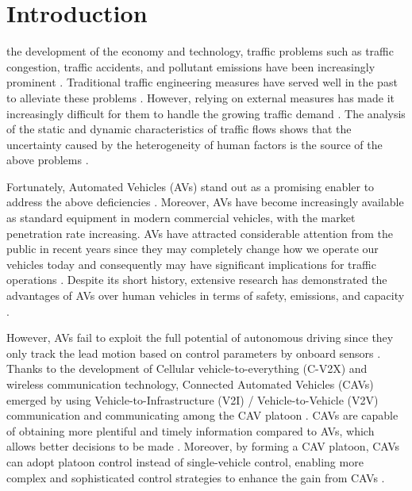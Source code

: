 \documentclass[journal]{IEEEtran}
\begin{document}
\IEEEpeerreviewmaketitle


\section{Introduction}
\label{Section 1}
% 
% 
% 
% 
 the development of the economy and technology, traffic problems such as traffic congestion, traffic accidents, and pollutant emissions have been increasingly prominent \citep{Wu2022,Malik2022,Behrendt2022}. Traditional traffic engineering measures have served well in the past to alleviate these problems \citep{Fricker2004,Hay1977}. However, relying on external measures has made it increasingly difficult for them to handle the growing traffic demand \citep{Zhong2020a,Ye2018a}. The analysis of the static and dynamic characteristics of traffic flows shows that the uncertainty caused by the heterogeneity of human factors is the source of the above problems \citep{Arem2016a,Yu2021a,vanLint2016}.

Fortunately, Automated Vehicles (AVs) stand out as a promising enabler to address the above deficiencies \citep{Rudin-Brown2004,Nikolos2015a}. Moreover, AVs have become increasingly available as standard equipment in modern commercial vehicles, with the market penetration rate increasing. AVs have attracted considerable attention from the public in recent years since they may completely change how we operate our vehicles today and consequently may have significant implications for traffic operations \citep{Kesting2007,Delis2016}. Despite its short history, extensive research has demonstrated the advantages of AVs over human vehicles in terms of safety, emissions, and capacity \citep{Ngoduy2012,Ioannou2005,Kerner2021}.

However, AVs fail to exploit the full potential of autonomous driving since they only track the lead motion based on control parameters by onboard sensors \citep{Ruan2022,Brunner2022}. Thanks to the development of Cellular vehicle-to-everything (C-V2X) and wireless communication technology, Connected Automated Vehicles (CAVs) emerged by using Vehicle-to-Infrastructure (V2I) / Vehicle-to-Vehicle (V2V) communication and communicating among the CAV platoon \citep{Wang2022,Qin2021a}. CAVs are capable of obtaining more plentiful and timely information compared to AVs, which allows better decisions to be made \citep{Mu2021,Liu2021b}. Moreover, by forming a CAV platoon, CAVs can adopt platoon control instead of single-vehicle control, enabling more complex and sophisticated control strategies to enhance the gain from CAVs \citep{Kim2021,Yang2021,Zhou2021a}.
\end{document}
